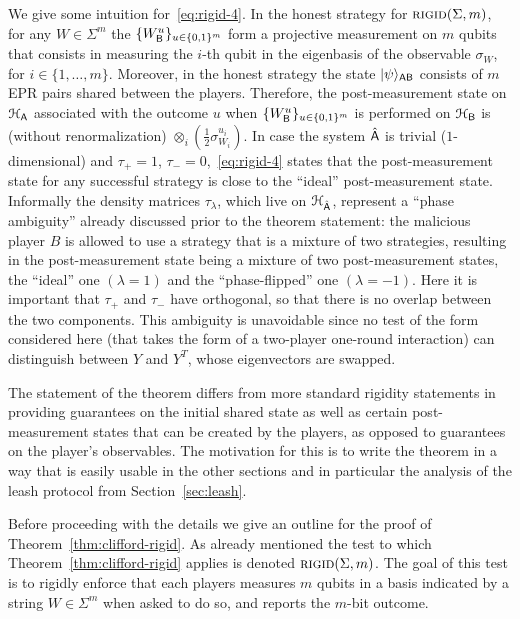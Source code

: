 We give some intuition for~\eqref{eq:rigid-4}. In the honest strategy for $\textsc{rigid}(\Sigma,m)$, for any $W\in \Sigma^m$ the $\{ W_{\textsf{B}}^u\}_{u\in\{0,1\}^m}$ form a projective measurement on $m$ qubits that consists in measuring the $i$-th qubit in the eigenbasis of the observable $\sigma_{W}$, for $i\in\{1,\ldots,m\}$. Moreover, in the honest strategy the state $|\psi\rangle_{{\textsf{AB}}}$ consists of $m$ EPR pairs shared between the players. Therefore, the post-measurement state on $\mathcal{H}_{\textsf{A}}$ associated with the outcome $u$ when  $\{ W_{\textsf{B}}^u\}_{u\in\{0,1\}^m}$ is performed on $\mathcal{H}_{\textsf{B}}$ is (without renormalization) $\otimes_i (\frac{1}{2}\sigma_{W_i}^{u_i})$. In case the system $\hat{{\textsf{A}}}$ is trivial ($1$-dimensional) and $\tau_+=1$, $\tau_-=0$,~\eqref{eq:rigid-4}  states that the post-measurement state for any successful strategy is close to the ``ideal'' post-measurement state. Informally the density matrices $\tau_\lambda$, which live on $\mathcal{H}_{\hat{{\textsf{A}}}}$, represent a ``phase ambiguity'' already discussed prior to the theorem statement: the malicious player $B$ is allowed to use a strategy that is a mixture of two strategies, resulting in the post-measurement state being a mixture of two post-measurement states, the ``ideal'' one $(\lambda=1)$ and the ``phase-flipped'' one $(\lambda=-1)$. Here it is important that $\tau_+$ and $\tau_-$ have orthogonal, so that there is no overlap between the two components. This ambiguity is unavoidable since no test of the form considered here (that takes the form of a two-player one-round interaction) can distinguish between $Y$ and $Y^T$, whose eigenvectors are swapped.  

The statement of the theorem differs from more standard rigidity statements in providing guarantees on the initial shared state as well as certain post-measurement states that can be created by the players, as opposed to guarantees on the player's observables. The motivation for this is to write the theorem in a way that is easily usable in the other sections and in particular the analysis of the leash protocol from Section~\ref{sec:leash}. 

\medskip

Before proceeding with the details we give an outline for the proof of Theorem~\ref{thm:clifford-rigid}. As already mentioned the test to which Theorem~\ref{thm:clifford-rigid} applies is denoted $\textsc{rigid}(\Sigma,m)$. The goal of this test is to rigidly enforce that each players measures $m$ qubits in a basis indicated by a string $W\in \Sigma^m$ when asked to do so, and reports the $m$-bit outcome. 

